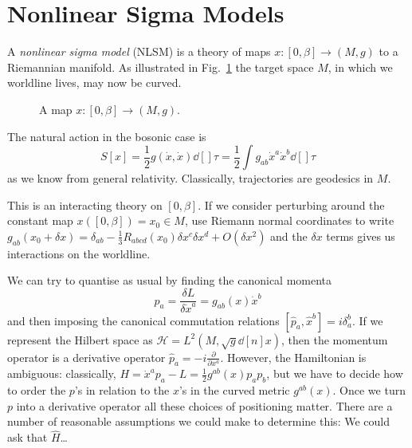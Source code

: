 
\section{Nonlinear Sigma Models}%
\label{sec:nonlinear_sigma_models}

A \emph{nonlinear sigma model} (NLSM) is a theory of maps $x \colon [0, \beta] \to (M, g)$  to a Riemannian manifold.
As illustrated in Fig.~\ref{fig:l9f1} the target space $M$, in which we worldline lives, may now be curved.
\begin{figure}[bth]
  \centering
  \def\svgwidth{0.6\columnwidth}
  
  \caption{A map $x\colon [0, \beta] \to (M, g)$.}
  \label{fig:l9f1}
\end{figure}
The natural action in the bosonic case is
\begin{equation}
  S[x] = \frac{1}{2} g (\dot{x}, \dot{x}) \dd[]{\tau} = \frac{1}{2} \int g_{ab} \dot{x}^{a} \dot{x}^{b} \dd[]{\tau}
\end{equation}
as we know from general relativity.
Classically, trajectories are geodesics in $M$.
\begin{remark}
  This is an interacting theory on $[0, \beta]$. If we consider perturbing around the constant map $x([0, \beta]) = x_0 \in M$, use Riemann normal coordinates to write $g_{ab}(x_0 + \delta x) = \delta_{ab} - \frac{1}{3} R_{abcd} (x_0) \delta x^{c} \delta x^{d} + O(\delta x^2)$ and the $\delta x$ terms gives us interactions on the worldline.
\end{remark}
We can try to quantise as usual by finding the canonical momenta
\begin{equation}
  p_a = \frac{\delta L}{\delta \dot{x}^a} = g_{ab}(x) \dot{x}^b
\end{equation}
and then imposing the canonical commutation relations $[\hat{p}_a, \hat{x}^b] = i \delta^{b}_a$.
If we represent the Hilbert space as $\mathscr{H} = L^2 (M, \sqrt{g} \dd[n]{x})$, then the momentum operator is a derivative operator $\hat{p}_a = -i \frac{\partial }{\partial x^a}$.
However, the Hamiltonian is ambiguous:
classically, $H = \dot{x}^a p_a - L = \frac{1}{2} g^{ab}(x) p_a p_b$, but we have to decide how to order the $p$'s in relation to the $x$'s in the curved metric $g^{ab}(x)$.
Once we turn $p$ into a derivative operator all these choices of positioning matter.
There are a number of reasonable assumptions we could make to determine this: We could ask that $\hat{H}$\dots
